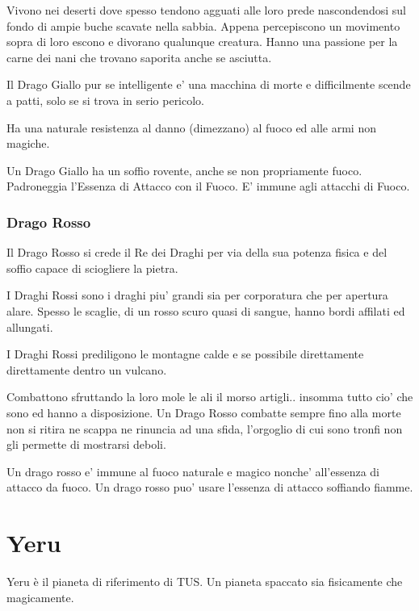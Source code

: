 \documentclass[a4paper,11pt,twoside,openany]{book}
\begin{document}
{Vivono nei deserti dove spesso tendono agguati alle loro prede nascondendosi sul fondo di ampie buche scavate nella sabbia.
Appena percepiscono un movimento sopra di loro escono e divorano qualunque creatura.
Hanno una passione per la carne dei nani che trovano saporita anche se asciutta.

Il Drago Giallo pur se intelligente e' una macchina di morte e difficilmente scende a patti, solo se si trova in serio pericolo.

Ha una naturale resistenza al danno (dimezzano) al fuoco ed alle armi non magiche.

Un Drago Giallo ha un soffio rovente, anche se non propriamente fuoco. 
Padroneggia l'Essenza di Attacco con il Fuoco. E' immune agli attacchi di Fuoco.


\subsubsection{Drago Rosso}  

Il Drago Rosso si crede il Re dei Draghi per via della sua potenza fisica e del soffio capace di sciogliere la pietra.

I Draghi Rossi sono i draghi piu' grandi sia per corporatura che per apertura alare.
Spesso le scaglie, di un rosso scuro quasi di sangue, hanno bordi affilati ed allungati.

I Draghi Rossi prediligono le montagne calde e se possibile direttamente direttamente dentro un vulcano.

Combattono sfruttando la loro mole le ali il morso artigli.. insomma tutto cio' che sono ed hanno a disposizione. Un Drago Rosso combatte sempre fino alla morte non si ritira ne scappa ne rinuncia ad una sfida, l'orgoglio di cui sono tronfi non gli permette di mostrarsi deboli.

Un drago rosso e' immune al fuoco naturale e magico nonche' all'essenza di attacco da fuoco.
Un drago rosso puo' usare l'essenza di attacco soffiando fiamme.



\pagebreak

\section{Yeru}

\label{yeru}

Yeru è il pianeta di riferimento di TUS. Un pianeta spaccato sia fisicamente che magicamente.

}
\end{document}
